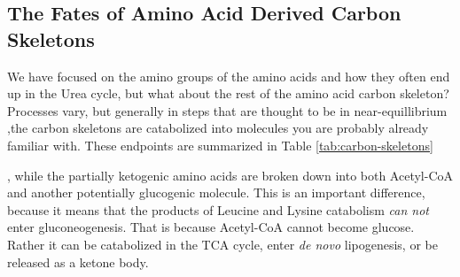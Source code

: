 \documentclass{tufte-handout}
\begin{document}
\subsection{The Fates of Amino Acid Derived Carbon Skeletons}

We have focused on the amino groups of the amino acids and how they often end up in the Urea cycle, but what about the rest of the amino acid carbon skeleton?  Processes vary, but generally in steps that are thought to be in near-equillibrium ,the carbon skeletons are catabolized into molecules you are probably already familiar with.  These endpoints are summarized in Table \ref{tab:carbon-skeletons}

, while the partially ketogenic amino acids are broken down into both Acetyl-CoA and another potentially glucogenic molecule.  This is an important difference, because it means that the products of Leucine and Lysine catabolism \emph{can not} enter gluconeogenesis.  That is because Acetyl-CoA cannot become glucose.  Rather it can be catabolized in the TCA cycle, enter \textit{de novo} lipogenesis, or be released as a ketone body.
\end{document}
